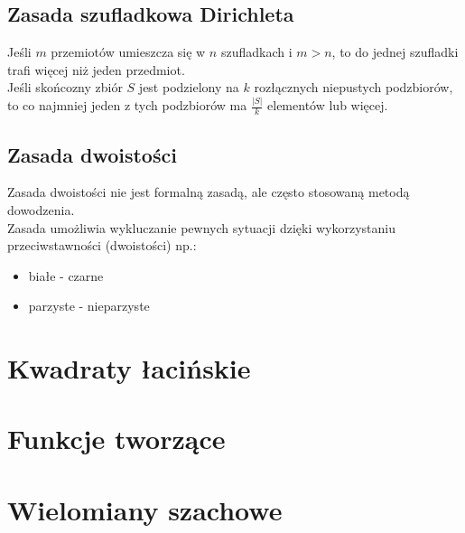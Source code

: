 \documentclass[a4paper,12pt]{article}
\begin{document}
\subsection{Zasada szufladkowa Dirichleta}
	Jeśli $m$ przemiotów umieszcza się w $n$ szufladkach i $m>n$, to do jednej szufladki trafi więcej niż jeden przedmiot.\\
	Jeśli skońcozny zbiór $S$ jest podzielony na $k$ rozłącznych niepustych podzbiorów, to co najmniej jeden z tych podzbiorów ma $\frac{|S|}{k}$ elementów lub więcej.
\subsection{Zasada dwoistości}
	Zasada dwoistości nie jest formalną zasadą, ale często stosowaną metodą dowodzenia.\\
	Zasada umożliwia wykluczanie pewnych sytuacji dzięki wykorzystaniu przeciwstawności (dwoistości) np.:
	\begin{itemize}
		\item białe - czarne 
		\item parzyste - nieparzyste
	\end{itemize}
\section{Kwadraty łacińskie}
\section{Funkcje tworzące}
\section{Wielomiany szachowe}
\end{document}
